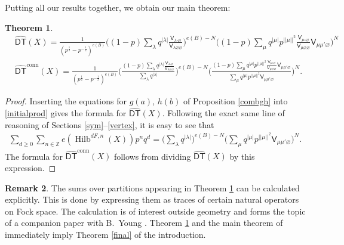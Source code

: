 \documentclass{amsart}
\newtheorem{theorem}{Theorem}%
\theoremstyle{definition}
\newtheorem{remark}[theorem]{Remark}
\newcommand{\ZZ} {\mathbb{Z}}		%
\newcommand{\sfV}{\mathsf{V}}
\newcommand{\Hilb}{\operatorname{Hilb}}
\newcommand{\DT}{\mathsf{DT}}
\newcommand{\conn}{\operatorname{conn}}
\newcommand{\DThat}{\widehat{\DT}}
\begin{document}
Putting all our results together, we obtain our main theorem:
\begin{theorem} \label{main}
\begin{align*}
&\DThat (X) = \frac{1}{(p^{\frac{1}{2}} - p^{-\frac{1}{2}})^{e(B)}} \Bigg( (1-p) \sum_{\lambda} q^{|\lambda|} \frac{\sfV_{\lambda\square\varnothing}}{\sfV_{\lambda\varnothing\varnothing}} \Bigg)^{e(B) - N}  \Bigg( (1-p) \sum_{\mu}  q^{|\mu|} p^{|\!|\mu|\!|^2} \frac{\sfV_{\mu\square\varnothing}}{\sfV_{\mu\varnothing\varnothing}} \sfV_{\mu\mu'\varnothing} \Bigg)^{N} \\
&\DThat ^{\conn}(X) = \frac{1}{(p^{\frac{1}{2}} - p^{-\frac{1}{2}})^{e(B)}} \Bigg( \frac{(1-p) \sum_{\lambda} q^{|\lambda|} \frac{\sfV_{\lambda\square\varnothing}}{\sfV_{\lambda\varnothing\varnothing}}}{\sum_{\lambda} q^{|\lambda|}} \Bigg)^{e(B) - N}  \Bigg( \frac{(1-p) \sum_{\mu}  q^{|\mu|} p^{|\!|\mu|\!|^2} \frac{\sfV_{\mu\square\varnothing}}{\sfV_{\mu\varnothing\varnothing}} \sfV_{\mu\mu'\varnothing}}{\sum_{\mu} q^{|\mu|} p^{|\!|\mu|\!|^2} \sfV_{\mu\mu'\varnothing}} \Bigg)^{N}.
\end{align*}
\end{theorem}
\begin{proof}
Inserting the equations for $g(a)$, $h(b)$ of Proposition \ref{combgh} into \eqref{initialprod} gives the formula for $\DThat (X)$. Following the exact same line of reasoning of Sections \ref{sym}--\ref{vertex}, it is easy to see that
\begin{align*}
\sum_{d \geq 0} \sum_{n \in \ZZ} e(\Hilb^{dF,n}(X)) p^n q^d = \Bigg( \sum_{\lambda} q^{|\lambda|} \Bigg)^{e(B) - N} \Bigg( \sum_{\mu} q^{|\mu|} p^{|\!|\mu|\!|^2} \sfV_{\mu\mu'\varnothing} \Bigg)^{N}.
\end{align*}
The formula for $\DThat ^{\conn}(X)$ follows from dividing $\DThat (X)$ by this expression.
\end{proof}

\begin{remark}
The sums over partitions appearing in Theorem \ref{main} can be calculated explicitly. This is done by expressing them as traces of certain natural operators on Fock space. The calculation is of interest outside geometry and forms the topic of a companion paper with B.~Young \cite{BKY}. Theorem \ref{main} and the main theorem of \cite{BKY} immediately imply Theorem \ref{final} of the introduction. 
\end{remark}
\end{document}
